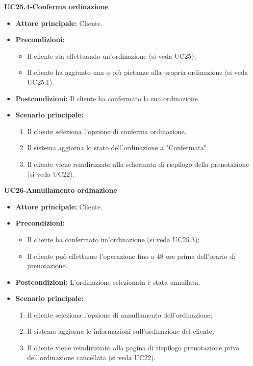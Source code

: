 \textbf{UC25.4-Conferma ordinazione}
\begin{itemize}
\item \textbf{Attore principale:} Cliente.
\item \textbf{Precondizioni:} 
    \begin{itemize}
        \item Il cliente sta effettuando un'ordinazione (si veda UC25);
        \item Il cliente ha aggiunto una o più pietanze alla propria ordinazione (si veda UC25.1).
    \end{itemize}
\item \textbf{Postcondizioni:} Il cliente ha confermato la sua ordinazione.
\item \textbf{Scenario principale:}
    \begin{enumerate}
        \item Il cliente seleziona l'opzione di conferma ordinazione.
        \item Il sistema aggiorna lo stato dell'ordinazione a "Confermata".
        \item Il cliente viene reindirizzato alla schermata di riepilogo della prenotazione (si veda UC22).
    \end{enumerate}
\end{itemize}


\textbf{UC26-Annullamento ordinazione}
\begin{itemize}
\item \textbf{Attore principale:} Cliente.
\item \textbf{Precondizioni:} 
\begin{itemize}
    \item Il cliente ha confermato un'ordinazione (si veda UC25.3);
    \item Il cliente può effettuare l'operazione fino a 48 ore prima dell'orario di prenotazione.
\end{itemize}
\item \textbf{Postcondizioni:} L'ordinazione selezionata è stata annullata.
\item \textbf{Scenario principale:}
\begin{enumerate}
    \item Il cliente seleziona l'opzione di annullamento dell'ordinazione;
    \item Il sistema aggiorna le informazioni sull'ordinazione del cliente;
    \item Il cliente viene reindirizzato alla pagina di riepilogo prenotazione priva dell'ordinazione cancellata (si veda UC22).
\end{enumerate}
\end{itemize}
